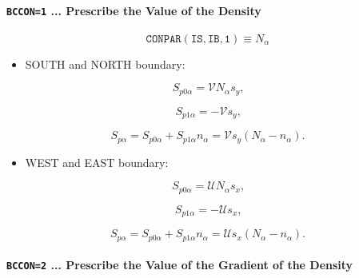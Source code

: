 \documentclass[11pt]{article}
\begin{document}
\bigskip

\paragraph{\texttt{BCCON=1} ... Prescribe the Value of the Density}

\bigskip

\begin{equation*}
\mathtt{CONPAR(IS,IB,1)}\equiv N_{\alpha}
\end{equation*}

\bigskip

\begin{itemize}
\item  SOUTH and NORTH boundary:
\end{itemize}

\begin{equation}
S_{p0\alpha}=\mathcal{V}N_{\alpha}s_{y}\text{,}   \label{c8}
\end{equation}

\begin{equation}
S_{p1\alpha}=-\mathcal{V}s_{y}\text{,}   \label{c9}
\end{equation}

\begin{equation}
S_{p\alpha}=S_{p0\alpha}+S_{p1\alpha}n_{\alpha}=\mathcal{V}s_{y}\left(
N_{\alpha}-n_{\alpha}\right) \text{.}   \label{c10}
\end{equation}

\begin{itemize}
\item  WEST and EAST boundary:
\end{itemize}

\begin{equation}
S_{p0\alpha}=\mathcal{U}N_{\alpha}s_{x}\text{,}   \label{c11}
\end{equation}

\begin{equation}
S_{p1\alpha}=-\mathcal{U}s_{x}\text{,}   \label{c12}
\end{equation}

\begin{equation}
S_{p\alpha}=S_{p0\alpha}+S_{p1\alpha}n_{\alpha}=\mathcal{U}s_{x}\left(
N_{\alpha}-n_{\alpha}\right) \text{.}   \label{c13}
\end{equation}

\bigskip

\paragraph{\texttt{BCCON=2} ... Prescribe the Value of the Gradient of the
Density}
\end{document}
